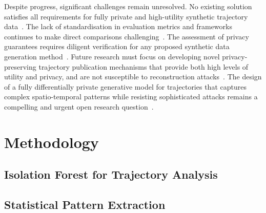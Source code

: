 \documentclass[runningheads]{llncs}
\begin{document}
Despite progress, significant challenges remain unresolved. No existing solution satisfies all requirements for fully private and high-utility synthetic trajectory data~\cite{Buchholz2024SoK}. The lack of standardisation in evaluation metrics and frameworks continues to make direct comparisons challenging~\cite{Primault2019LongRoad,Jin2023SurveyExpStudy}. The assessment of privacy guarantees requires diligent verification for any proposed synthetic data generation method~\cite{Buchholz2024SoK}. Future research must focus on developing novel privacy-preserving trajectory publication mechanisms that provide both high levels of utility and privacy, and are not susceptible to reconstruction attacks~\cite{Buchholz2022RAoPT,Buchholz2024SoK,Primault2019LongRoad}. The design of a fully differentially private generative model for trajectories that captures complex spatio-temporal patterns while resisting sophisticated attacks remains a compelling and urgent open research question~\cite{Buchholz2024SoK,Buchholz2022RAoPT}.


\section{Methodology}
\label{sec:methodology}

\subsection{Isolation Forest for Trajectory Analysis}
\label{sec:iso}

\begin{compactoutline}
\end{compactoutline}

\subsection{Statistical Pattern Extraction}
\label{sec:pattern-extraction}

\begin{compactoutline}
\end{compactoutline}
\end{document}
